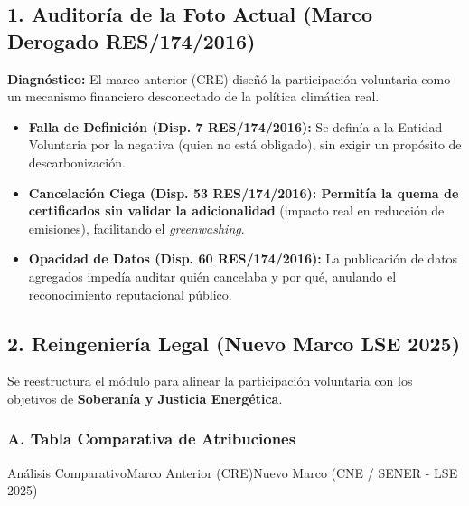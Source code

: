 \documentclass{cel}
\begin{document}
\subsection{1. Auditoría de la \textquotedbl{}Foto Actual\textquotedbl{} (Marco Derogado RES/174/2016)}
\nopagebreak

\textbf{Diagnóstico:} El marco anterior (CRE) diseñó la participación voluntaria como un mecanismo financiero desconectado de la política climática real.


\begin{itemize}
\item \textbf{Falla de Definición (Disp. 7 RES/174/2016):} Se definía a la Entidad Voluntaria por la negativa (\textquotedbl{}quien no está obligado\textquotedbl{}), sin exigir un propósito de descarbonización.
\item \textbf{Cancelación \textquotedbl{}Ciega\textquotedbl{} (Disp. 53 RES/174/2016): \textbf{ Permitía la quema de certificados sin validar la }adicionalidad} (impacto real en reducción de emisiones), facilitando el \textit{greenwashing}.
\item \textbf{Opacidad de Datos (Disp. 60 RES/174/2016):} La publicación de datos agregados impedía auditar quién cancelaba y por qué, anulando el reconocimiento reputacional público.


\end{itemize}
\subsection{2. Reingeniería Legal (Nuevo Marco LSE 2025)}
\nopagebreak

Se reestructura el módulo para alinear la participación voluntaria con los objetivos de \textbf{Soberanía y Justicia Energética}.


\vspace{0.4cm}
\subsubsection{A. Tabla Comparativa de Atribuciones}
\nopagebreak

\vspace{0.3cm}
\begin{tablaParadigmaV2}{Análisis Comparativo}{Marco Anterior (CRE)}{Nuevo Marco (CNE / SENER - LSE 2025)}
\end{tablaParadigmaV2}
\end{document}

